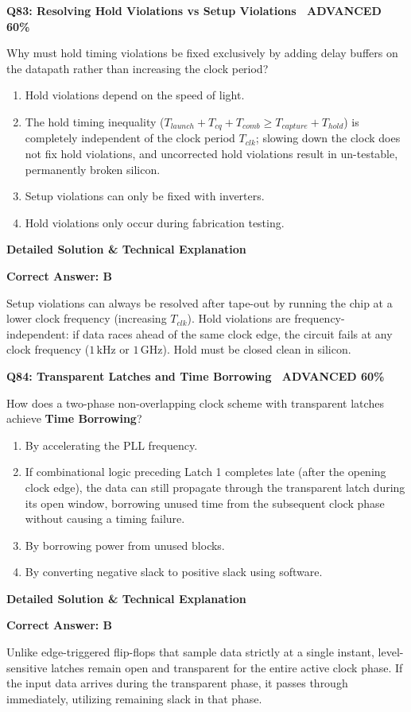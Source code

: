 \documentclass[11pt,a4paper]{article}
\newcommand{\badgeadv}{{\color{white}\colorbox{advred}{\bfseries\sffamily\tiny\ ADVANCED 60\%\ }}}
\newenvironment{qbox}[2]{%
  \begin{mdframed}[style=qstyle]%
  {\bfseries\sffamily\color{primaryblue}#1 \hfill #2}\par\vspace{2pt}%
}{%
  \end{mdframed}%
}
\newenvironment{ansbox}{%
  \begin{mdframed}[style=ansstyle]%
  {\bfseries\sffamily\color{ansgreen}\small Detailed Solution \& Technical Explanation}\par\vspace{2pt}\small%
}{%
  \end{mdframed}%
}
\begin{document}
\begin{qbox}{Q83: Resolving Hold Violations vs Setup Violations}{\badgeadv}
Why must hold timing violations be fixed exclusively by adding delay buffers on the datapath rather than increasing the clock period?
\begin{enumerate}[label=\textbf{\Alph*.}]
  \item Hold violations depend on the speed of light.
  \item The hold timing inequality ($T_{launch} + T_{cq} + T_{comb} \ge T_{capture} + T_{hold}$) is completely independent of the clock period $T_{clk}$; slowing down the clock does not fix hold violations, and uncorrected hold violations result in un-testable, permanently broken silicon.
  \item Setup violations can only be fixed with inverters.
  \item Hold violations only occur during fabrication testing.
\end{enumerate}
\end{qbox}
\begin{ansbox}
\textbf{Correct Answer: B}

Setup violations can always be resolved after tape-out by running the chip at a lower clock frequency (increasing $T_{clk}$). Hold violations are frequency-independent: if data races ahead of the same clock edge, the circuit fails at any clock frequency ($1\,\text{kHz}$ or $1\,\text{GHz}$). Hold must be closed clean in silicon.
\end{ansbox}

\begin{qbox}{Q84: Transparent Latches and Time Borrowing}{\badgeadv}
How does a two-phase non-overlapping clock scheme with transparent latches achieve \textbf{Time Borrowing}?
\begin{enumerate}[label=\textbf{\Alph*.}]
  \item By accelerating the PLL frequency.
  \item If combinational logic preceding Latch 1 completes late (after the opening clock edge), the data can still propagate through the transparent latch during its open window, borrowing unused time from the subsequent clock phase without causing a timing failure.
  \item By borrowing power from unused blocks.
  \item By converting negative slack to positive slack using software.
\end{enumerate}
\end{qbox}
\begin{ansbox}
\textbf{Correct Answer: B}

Unlike edge-triggered flip-flops that sample data strictly at a single instant, level-sensitive latches remain open and transparent for the entire active clock phase. If the input data arrives during the transparent phase, it passes through immediately, utilizing remaining slack in that phase.
\end{ansbox}
\end{document}
